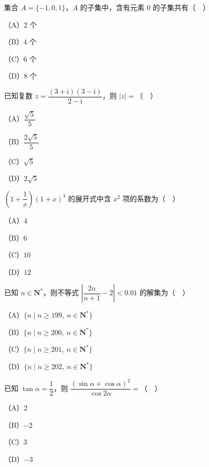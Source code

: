 


\begin{question}
集合 $A=\{-1,0,1\}$，$A$ 的子集中，含有元素 $0$ 的子集共有（　）

（A）$2$ 个

（B）$4$ 个

（C）$6$ 个

（D）$8$ 个

\end{question}
\begin{question}
已知复数 $z=\dfrac{(3+\mathrm i)(3-\mathrm i)}{2-\mathrm i}$，则 $|z|=$（　）

（A）$\dfrac{\sqrt5}5$

（B）$\dfrac{2\sqrt5}5$

（C）$\sqrt5$

（D）$2\sqrt5$

\end{question}
\begin{question}
$\left(1+\dfrac1x\right)(1+x)^4$ 的展开式中含 $x^2$ 项的系数为（　）

（A）$4$

（B）$6$

（C）$10$

（D）$12$

\end{question}
\begin{question}
已知 $n\in\mathbf N^*$，则不等式 $\left|\dfrac{2n}{n+1}-2\right|<0.01$ 的解集为（　）

（A）$\{n\mid n\geqslant199,\ n\in\mathbf N^*\}$

（B）$\{n\mid n\geqslant200,\ n\in\mathbf N^*\}$

（C）$\{n\mid n\geqslant201,\ n\in\mathbf N^*\}$

（D）$\{n\mid n\geqslant202,\ n\in\mathbf N^*\}$

\end{question}
\begin{question}
已知 $\tan\alpha=\dfrac12$，则 $\dfrac{(\sin\alpha+\cos\alpha)^2}{\cos2\alpha}=$（　）

（A）$2$

（B）$-2$

（C）$3$

（D）$-3$

\end{question}
